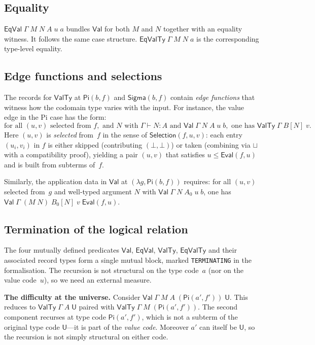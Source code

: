 \documentclass[11pt]{article}
\newcommand{\hastype}[3]{#1 \vdash #2 : #3}
\newcommand{\App}[2]{#1\;#2}
\newcommand{\substone}[2]{#1[#2]}
\newcommand{\U}{\mathsf{U}}
\newcommand{\PiC}[2]{\mathsf{Pi}(#1,#2)}
\newcommand{\SigmaC}[2]{\mathsf{Sigma}(#1,#2)}
\newcommand{\Val}{\mathsf{Val}}
\newcommand{\EqVal}{\mathsf{EqVal}}
\newcommand{\ValTy}{\mathsf{ValTy}}
\newcommand{\EqValTy}{\mathsf{EqValTy}}
\newcommand{\EvalFun}{\mathsf{Eval}}
\newcommand{\Bot}{\bot}
\begin{document}
\subsection{Equality}

$\EqVal\;\Gamma\;M\;N\;A\;u\;a$ bundles $\Val$ for both $M$ and $N$
together with an equality witness.  It follows the same case structure.
$\EqValTy\;\Gamma\;M\;N\;a$ is the corresponding type-level equality.

\subsection{Edge functions and selections}

The records for $\ValTy$ at $\PiC{b}{f}$ and $\SigmaC{b}{f}$ contain
\emph{edge functions} that witness how the codomain type varies with the
input.  For instance, the value edge in the Pi case has the form:
\[
  \text{for all } (u,v) \text{ selected from } f, \text{ and }
  N \text{ with } \hastype{\Gamma}{N}{A} \text{ and }
  \Val\;\Gamma\;N\;A\;u\;b,
  \text{ one has }
  \ValTy\;\Gamma\;\substone{B}{N}\;v.
\]
Here $(u,v)$ is \emph{selected} from~$f$ in the sense of
$\mathsf{Selection}(f, u, v)$: each entry $(u_i, v_i)$ in $f$ is either
skipped (contributing $(\Bot,\Bot)$) or taken (combining via $\sqcup$
with a compatibility proof), yielding a pair $(u,v)$ that satisfies
$u \leq \EvalFun(f, u)$ and is built from subterms of~$f$.

Similarly, the application data in $\Val$ at $(\lambda g, \PiC{b}{f})$
requires: for all $(u,v)$ selected from~$g$ and well-typed argument $N$ with
$\Val\;\Gamma\;N\;A_0\;u\;b$, one has
$\Val\;\Gamma\;(\App{M}{N})\;\substone{B_0}{N}\;v\;\EvalFun(f,u)$.

\subsection{Termination of the logical relation}
\label{sec:val-termination}

The four mutually defined predicates $\Val$, $\EqVal$, $\ValTy$, $\EqValTy$
and their associated record types form a single mutual block, marked
\texttt{TERMINATING} in the formalisation.  The recursion is not structural
on the type code~$a$ (nor on the value code~$u$), so we need an external
measure.

\medskip\noindent\textbf{The difficulty at the universe.}
Consider $\Val\;\Gamma\;M\;A\;(\PiC{a'}{f'})\;\U$.
This reduces to $\ValTy\;\Gamma\;A\;\U$ paired with
$\ValTy\;\Gamma\;M\;(\PiC{a'}{f'})$.  The second component recurses at
type code $\PiC{a'}{f'}$, which is not a subterm of the original type code
$\U$---it is part of the \emph{value code}.  Moreover $a'$ can itself be
$\U$, so the recursion is not simply structural on either code.
\end{document}
